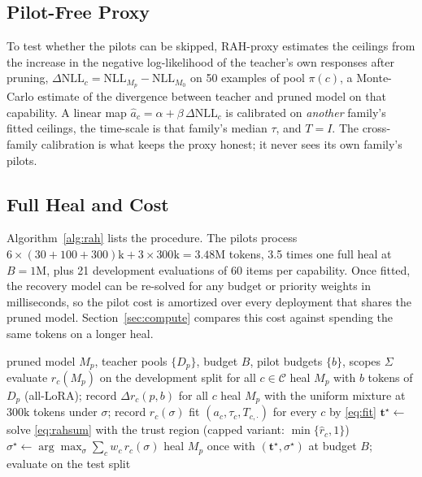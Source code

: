 \documentclass{ieeeaccess}
\newcommand{\Mz}{M_{0}}
\newcommand{\Mp}{M_{p}}
\newcommand{\caps}{\mathcal{C}}
\newcommand{\pools}{\mathcal{P}}
\newcommand{\own}{\pi}
\newcommand{\tvec}{\mathbf{t}}
\newcommand{\RAH}{RAH}
\begin{document}
\subsection{Pilot-Free Proxy}
To test whether the pilots can be skipped, \RAH-proxy estimates the ceilings from the increase in the negative log-likelihood of the teacher's own responses after pruning, $\Delta\mathrm{NLL}_c = \mathrm{NLL}_{\Mp} - \mathrm{NLL}_{\Mz}$ on 50 examples of pool $\own(c)$, a Monte-Carlo estimate of the divergence between teacher and pruned model on that capability. A linear map $\hat a_c = \alpha + \beta\,\Delta\mathrm{NLL}_c$ is calibrated on \emph{another} family's fitted ceilings, the time-scale is that family's median $\tau$, and $T = I$. The cross-family calibration is what keeps the proxy honest; it never sees its own family's pilots.

\subsection{Full Heal and Cost}
Algorithm~\ref{alg:rah} lists the procedure. The pilots process $6\times(30+100+300)\mathrm{k} + 3\times 300\mathrm{k} = 3.48\mathrm{M}$ tokens, 3.5 times one full heal at $B = 1\mathrm{M}$, plus 21 development evaluations of 60 items per capability. Once fitted, the recovery model can be re-solved for any budget or priority weights in milliseconds, so the pilot cost is amortized over every deployment that shares the pruned model. Section~\ref{sec:compute} compares this cost against spending the same tokens on a longer heal.

\begin{algorithm}[t]
\caption{Recoverability-Aware Healing}
\label{alg:rah}
\begin{algorithmic}[1]
\REQUIRE pruned model $\Mp$, teacher pools $\{D_p\}$, budget $B$, pilot budgets $\{b\}$, scopes $\Sigma$
\STATE evaluate $r_c(\Mp)$ on the development split for all $c\in\caps$
\FOR{each pool $p\in\pools$ and budget $b$}
  \STATE heal $\Mp$ with $b$ tokens of $D_p$ (all-LoRA); record $\Delta r_c(p,b)$ for all $c$
\ENDFOR
{}
  \STATE heal $\Mp$ with the uniform mixture at $300\mathrm{k}$ tokens under $\sigma$; record $r_c(\sigma)$
\ENDFOR
\STATE fit $(a_c,\tau_c,T_{c,\cdot})$ for every $c$ by \eqref{eq:fit}
\STATE $\tvec^\star \leftarrow$ solve \eqref{eq:rahsum} with the trust region (capped variant: $\min\{\hat r_c,1\}$)
\STATE $\sigma^\star \leftarrow \arg\max_\sigma \sum_c w_c\,r_c(\sigma)$
\STATE heal $\Mp$ once with $(\tvec^\star,\sigma^\star)$ at budget $B$; evaluate on the test split
\end{algorithmic}
\end{algorithm}
\end{document}
